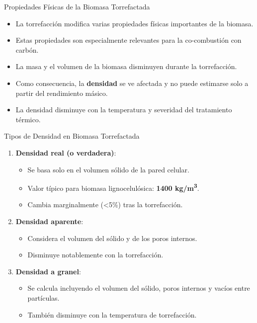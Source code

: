 \documentclass[main.tex]{subfiles}
\begin{document}
\begin{frame}{Propiedades Físicas de la Biomasa Torrefactada}
\small
\begin{itemize}
  \item La torrefacción modifica varias propiedades físicas importantes de la biomasa.
  \item Estas propiedades son especialmente relevantes para la co-combustión con carbón.
  \item La masa y el volumen de la biomasa disminuyen durante la torrefacción.
  \item Como consecuencia, la \textbf{densidad} se ve afectada y no puede estimarse solo a partir del rendimiento másico.
  \item La densidad disminuye con la temperatura y severidad del tratamiento térmico.
\end{itemize}
\end{frame}


\begin{frame}{Tipos de Densidad en Biomasa Torrefactada}
\small
\begin{enumerate}
  \item \textbf{Densidad real (o verdadera)}:
  \begin{itemize}
    \item Se basa solo en el volumen sólido de la pared celular.
    \item Valor típico para biomasa lignocelulósica: \textbf{1400 kg/m\textsuperscript{3}}.
    \item Cambia marginalmente (<5\%) tras la torrefacción.
  \end{itemize}

  \item \textbf{Densidad aparente}:
  \begin{itemize}
    \item Considera el volumen del sólido y de los poros internos.
    \item Disminuye notablemente con la torrefacción.
  \end{itemize}

  \item \textbf{Densidad a granel}:
  \begin{itemize}
    \item Se calcula incluyendo el volumen del sólido, poros internos y vacíos entre partículas.
    \item También disminuye con la temperatura de torrefacción.
  \end{itemize}
\end{enumerate}
\end{frame}
\end{document}
